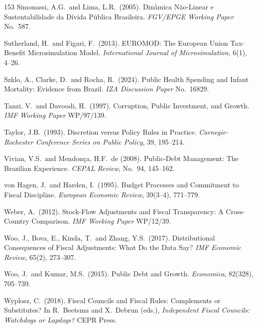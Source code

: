 \documentclass[11pt,a4paper]{article}
\begin{document}
\begin{thebibliography}{153}
 Simonassi, A.G.\ and Lima, L.R.\ (2005). Din\^amica N\~ao-Linear e Sustentabilidade da D\'ivida P\'ublica Brasileira. \textit{FGV/EPGE Working Paper} No.\ 587.

 Sutherland, H.\ and Figari, F.\ (2013). EUROMOD: The European Union Tax-Benefit Microsimulation Model. \textit{International Journal of Microsimulation}, 6(1), 4--26.

 Szklo, A., Clarke, D.\ and Rocha, R.\ (2024). Public Health Spending and Infant Mortality: Evidence from Brazil. \textit{IZA Discussion Paper} No.\ 16829.

 Tanzi, V.\ and Davoodi, H.\ (1997). Corruption, Public Investment, and Growth. \textit{IMF Working Paper} WP/97/139.

 Taylor, J.B.\ (1993). Discretion versus Policy Rules in Practice. \textit{Carnegie-Rochester Conference Series on Public Policy}, 39, 195--214.

 Vivian, V.S.\ and Mendon\c{c}a, H.F.\ de (2008). Public-Debt Management: The Brazilian Experience. \textit{CEPAL Review}, No.\ 94, 145--162.

 von Hagen, J.\ and Harden, I.\ (1995). Budget Processes and Commitment to Fiscal Discipline. \textit{European Economic Review}, 39(3--4), 771--779.

 Weber, A.\ (2012). Stock-Flow Adjustments and Fiscal Transparency: A Cross-Country Comparison. \textit{IMF Working Paper} WP/12/39.

 Woo, J., Bova, E., Kinda, T.\ and Zhang, Y.S.\ (2017). Distributional Consequences of Fiscal Adjustments: What Do the Data Say? \textit{IMF Economic Review}, 65(2), 273--307.

 Woo, J.\ and Kumar, M.S.\ (2015). Public Debt and Growth. \textit{Economica}, 82(328), 705--739.

 Wyplosz, C.\ (2018). Fiscal Councils and Fiscal Rules: Complements or Substitutes? In R.\ Beetsma and X.\ Debrun (eds.), \textit{Independent Fiscal Councils: Watchdogs or Lapdogs?} CEPR Press.

\end{thebibliography}
\end{document}
